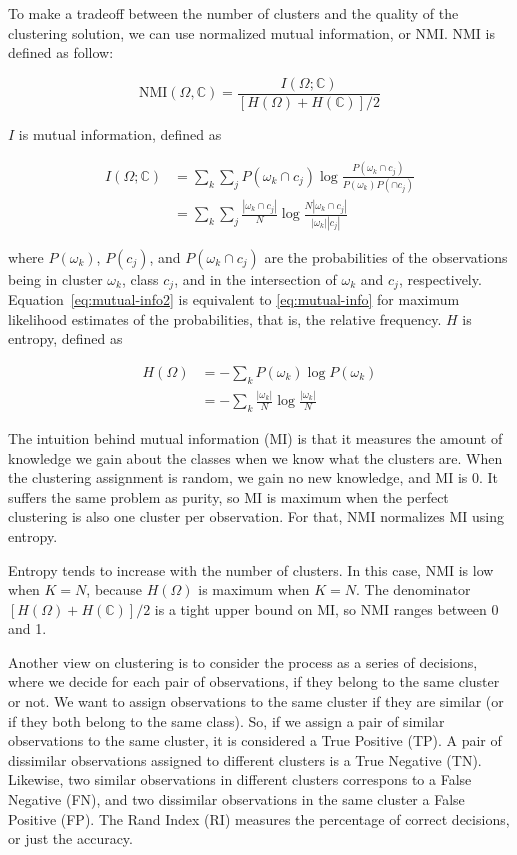To make a tradeoff between the number of clusters and the quality of the
clustering solution, we can use normalized mutual information, or NMI.
%
NMI is defined as follow:

$$ \text{NMI}(\Omega, \mathbb{C}) = \frac{I(\Omega; \mathbb{C})}{[H(\Omega) + H(\mathbb{C})]/2} $$

$I$ is mutual information, defined as 


\begin{align}
    I(\Omega; \mathbb{C}) &= \sum_k \sum_j P(\omega_k \cap c_j) \log \frac{P(\omega_k \cap c_j)}{P(\omega_k) P(\cap c_j)} \label{eq:mutual-info} \\ 
    & = \sum_k \sum_j \frac{|\omega_k \cap c_j|}{N} \log \frac{N|\omega_k \cap c_j|}{|\omega_k| |c_j|} \label{eq:mutual-info2}
\end{align}



where $P(\omega_k)$, $P(c_j)$, and $P(\omega_k \cap c_j)$ are the probabilities
of the observations being in cluster $\omega_k$, class $c_j$, and in the
intersection of $\omega_k$ and $c_j$, respectively. 
%
Equation~\ref{eq:mutual-info2} is equivalent to \ref{eq:mutual-info} for maximum
likelihood estimates of the probabilities, that is, the relative frequency.
%
$H$ is entropy, defined as 

\begin{align}
H(\Omega) &= - \sum_k P(\omega_k) \log P(\omega_k) \label{eq:entropy} \\
&= - \sum_k \frac{|\omega_k|}{N} \log \frac{|\omega_k|}{N} \label{eq:entropy2}
\end{align}
    
The intuition behind mutual information (MI) is that it measures the amount of
knowledge we gain about the classes when we know what the clusters are. 
%
When the clustering assignment is random, we gain no new knowledge, and MI is 0.
%
It suffers the same problem as purity, so MI is maximum when the perfect
clustering is also one cluster per observation.
%
For that, NMI normalizes MI using entropy.


Entropy tends to increase with the number of clusters. 
%
In this case, NMI is low when $K = N$, because $H(\Omega)$ is maximum when $K =
N$. 
%
The denominator $[H(\Omega) + H(\mathbb{C})]/2$ is a tight upper bound on MI, so
NMI ranges between 0 and 1.


Another view on clustering is to consider the process as a series of decisions,
where we decide for each pair of observations, if they belong to the same
cluster or not.
%
We want to assign observations to the same cluster if they are similar (or if
they both belong to the same class).
%
So, if we assign a pair of similar observations to the same cluster, it is
considered a True Positive (TP). 
%
A pair of dissimilar observations assigned to different clusters is a True
Negative (TN).
%
Likewise, two similar observations in different clusters correspons to a False
Negative (FN), and two dissimilar observations in the same cluster a False
Positive (FP).
%
The Rand Index (RI) measures the percentage of correct decisions, or just the
accuracy.


